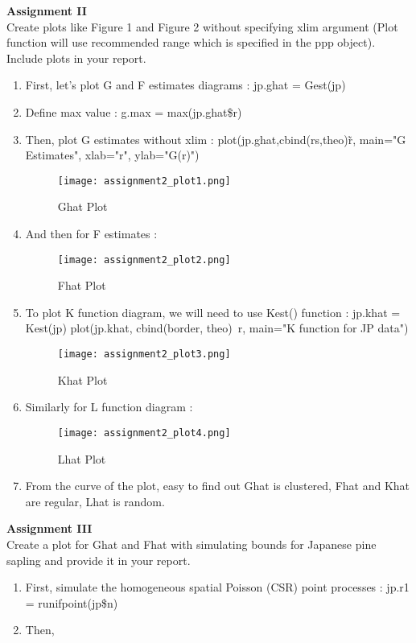 \documentclass[a4,10pt]{article}
\begin{document}
\begin{center}
\textbf{Assignment II} \\
Create plots like Figure 1 and Figure 2 without specifying xlim argument (Plot function will use recommended range which is specified in the ppp object). Include plots in your report.
\end{center}
\begin{enumerate}
\item First, let’s plot G and F estimates diagrams : jp.ghat = Gest(jp) \newline
\item Define max value : g.max = max(jp.ghat\$r) \newline
\item Then, plot G estimates without xlim : plot(jp.ghat,cbind(rs,theo)\~r, main="G Estimates", xlab="r", ylab="G(r)")

\begin{figure}[htbp]
\texttt{[image: assignment2\_plot1.png]}
\caption{Ghat Plot}
\label{2}
\end{figure} 

\item And then for F estimates :

\begin{figure}[htbp]
\texttt{[image: assignment2\_plot2.png]}
\caption{Fhat Plot}
\label{3}
\end{figure} 

\item To plot K function diagram, we will need to use Kest() function : \newline
jp.khat = Kest(jp) \newline
plot(jp.khat, cbind(border, theo)~r, main="K function for JP data")

\begin{figure}[htbp]
\texttt{[image: assignment2\_plot3.png]}
\caption{Khat Plot}
\label{4}
\end{figure} 

\item Similarly for L function diagram : 
\begin{figure}[htbp]
\texttt{[image: assignment2\_plot4.png]}
\caption{Lhat Plot}
\label{5}
\end{figure} 

\item From the curve of the plot, easy to find out Ghat is clustered, Fhat and Khat are regular, Lhat is random. 
\end{enumerate}
\begin{center}
\textbf{Assignment III} \\
Create a plot for Ghat and Fhat with simulating bounds for Japanese pine sapling and provide it in your report.
\end{center}
\begin{enumerate}
\item First, simulate the homogeneous spatial Poisson (CSR) point processes : \newline
jp.r1 = runifpoint(jp\$n)
\item Then, 

\end{enumerate}
\end{document}
